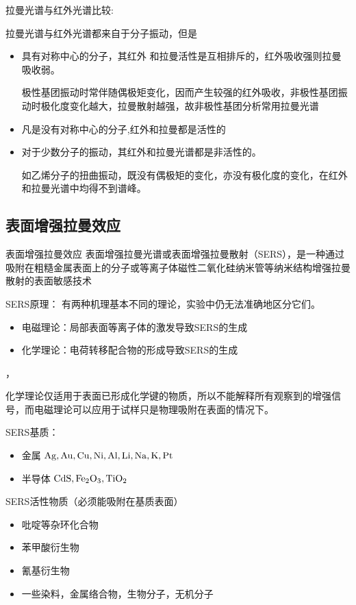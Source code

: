 \begin{note}
    拉曼光谱与红外光谱比较:

    拉曼光谱与红外光谱都来自于分子振动，但是
    \begin{itemize}
        \item 具有对称中心的分子，其红外	和拉曼活性是互相排斥的，红外吸收强则拉曼吸收弱。
        
        \begin{example}
            极性基团振动时常伴随偶极矩变化，因而产生较强的红外吸收，非极性基团振动时极化度变化越大，拉曼散射越强，故非极性基团分析常用拉曼光谱
        \end{example}
        \item 凡是没有对称中心的分子,红外和拉曼都是活性的
        \item 对于少数分子的振动，其红外和拉曼光谱都是非活性的。
        \begin{example}
            如乙烯分子的扭曲振动，既没有偶极矩的变化，亦没有极化度的变化，在红外和拉曼光谱中均得不到谱峰。
        \end{example}
    \end{itemize}
\end{note}
\subsection{表面增强拉曼效应}
\begin{definition*}{表面增强拉曼效应}
    表面增强拉曼光谱或表面增强拉曼散射（SERS），是一种通过吸附在粗糙金属表面上的分子或等离子体磁性二氧化硅纳米管等纳米结构增强拉曼散射的表面敏感技术
\end{definition*}

SERS原理：
有两种机理基本不同的理论，实验中仍无法准确地区分它们。
\begin{itemize}
    \item 电磁理论：局部表面等离子体的激发导致SERS的生成
    \item 化学理论：电荷转移配合物的形成导致SERS的生成
\end{itemize}，
\begin{note}
    化学理论仅适用于表面已形成化学键的物质，所以不能解释所有观察到的增强信号，而电磁理论可以应用于试样只是物理吸附在表面的情况下。
\end{note}

SERS基质： 
\begin{itemize}
    \item     金属    $\ce{Ag},\ce{ Au}, \ce{Cu},\ce{Ni},\ce{ Al},\ce{ Li},\ce{ Na,} \ce{K}, \ce{Pt}$
    \item     半导体  $\ce{CdS}, \ce{Fe_{2}O_{3}}, \ce{TiO_{2}}$
\end{itemize}


SERS活性物质（必须能吸附在基质表面）
\begin{itemize}
    \item 	吡啶等杂环化合物
    \item   苯甲酸衍生物
    \item   氰基衍生物
    \item   一些染料，金属络合物，生物分子，无机分子
\end{itemize}
